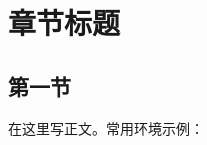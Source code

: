 \documentclass[12pt, a4paper, oneside, UTF8]{ctexbook}
\begin{document}
\else
\fi

\chapter{{{章节标题}}}

\section{第一节}

在这里写正文。常用环境示例：




\ifx\allfiles\undefined
\end{document}
